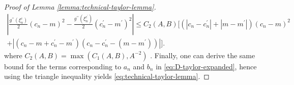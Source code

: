 \documentclass[11pt]{article}
\numberwithin{equation}{section}
\theoremstyle{definition}
\theoremstyle{remark}
\begin{document}
\begin{proof}[Proof of Lemma \ref{lemma:technical-taylor-lemma}]
    \begin{equation*}
        \label{eq:D-term-upper-bound}
        \begin{aligned}
            \left| \frac{g^{\prime \prime}(\xi_n^c)}{2}(c_n - m)^2 - \frac{g^{\prime \prime}(\xi_n^{c^\prime})}{2}(c^\prime_n - m^\prime)^2 \right| \leq C_2(A,B) \big[(|c_n - c_n^\prime| + |m - m^\prime|)(c_n - m)^2 \\
                + \left|(c_n - m + c^\prime_n - m^\prime)(c_n - c^\prime_n - (m - m^\prime)) \right|\big].
        \end{aligned}
    \end{equation*}
    where $C_2(A,B) = \max(C_1(A,B), A^{-2})$ . Finally, one can derive the same bound for the terms corresponding to $a_n$ and $b_n$ in \eqref{eq:D-taylor-expanded}, hence using the triangle inequality yields \eqref{eq:technical-taylor-lemma}.
\end{proof}
\end{document}
